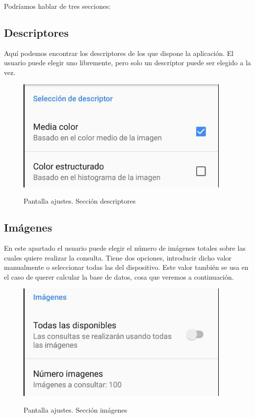 Podríamos hablar de tres secciones:

\subsection{Descriptores}

Aquí podemos encontrar los descriptores de los que dispone la aplicación. El usuario puede elegir uno libremente, pero solo un descriptor puede ser elegido a la vez.

\begin{figure}[H] %
\centering
\includegraphics[scale=0.5]{imagenes/ajustesdescriptor.png}  %
\label{ajustesdescriptor.png}
\caption{Pantalla ajustes. Sección descriptores}
\end{figure}

\subsection{Imágenes}

En este apartado el usuario puede elegir el número de imágenes totales sobre las cuales quiere realizar la consulta. Tiene dos opciones, introducir dicho valor manualmente o seleccionar todas las del dispositivo. Este valor también se usa en el caso de querer calcular la base de datos, cosa que veremos a continuación.

\begin{figure}[H] %
\centering
\includegraphics[scale=0.5]{imagenes/ajustesimagenes.png}  %
\label{ajustesimagenes.png}
\caption{Pantalla ajustes. Sección imágenes}
\end{figure}

